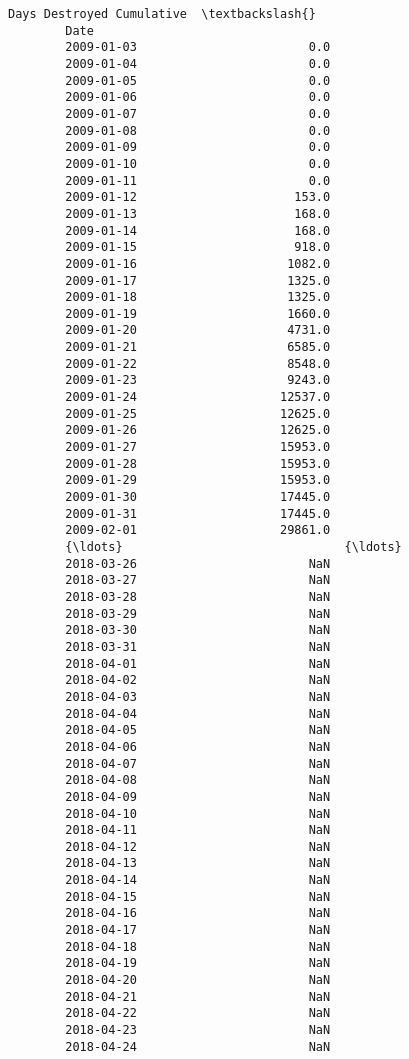 \documentclass[11pt]{article}
\begin{document}
\begin{Verbatim}[commandchars=\\\{\}]
                    Days Destroyed Cumulative  \textbackslash{}
        Date                                    
        2009-01-03                        0.0   
        2009-01-04                        0.0   
        2009-01-05                        0.0   
        2009-01-06                        0.0   
        2009-01-07                        0.0   
        2009-01-08                        0.0   
        2009-01-09                        0.0   
        2009-01-10                        0.0   
        2009-01-11                        0.0   
        2009-01-12                      153.0   
        2009-01-13                      168.0   
        2009-01-14                      168.0   
        2009-01-15                      918.0   
        2009-01-16                     1082.0   
        2009-01-17                     1325.0   
        2009-01-18                     1325.0   
        2009-01-19                     1660.0   
        2009-01-20                     4731.0   
        2009-01-21                     6585.0   
        2009-01-22                     8548.0   
        2009-01-23                     9243.0   
        2009-01-24                    12537.0   
        2009-01-25                    12625.0   
        2009-01-26                    12625.0   
        2009-01-27                    15953.0   
        2009-01-28                    15953.0   
        2009-01-29                    15953.0   
        2009-01-30                    17445.0   
        2009-01-31                    17445.0   
        2009-02-01                    29861.0   
        {\ldots}                               {\ldots}   
        2018-03-26                        NaN   
        2018-03-27                        NaN   
        2018-03-28                        NaN   
        2018-03-29                        NaN   
        2018-03-30                        NaN   
        2018-03-31                        NaN   
        2018-04-01                        NaN   
        2018-04-02                        NaN   
        2018-04-03                        NaN   
        2018-04-04                        NaN   
        2018-04-05                        NaN   
        2018-04-06                        NaN   
        2018-04-07                        NaN   
        2018-04-08                        NaN   
        2018-04-09                        NaN   
        2018-04-10                        NaN   
        2018-04-11                        NaN   
        2018-04-12                        NaN   
        2018-04-13                        NaN   
        2018-04-14                        NaN   
        2018-04-15                        NaN   
        2018-04-16                        NaN   
        2018-04-17                        NaN   
        2018-04-18                        NaN   
        2018-04-19                        NaN   
        2018-04-20                        NaN   
        2018-04-21                        NaN   
        2018-04-22                        NaN   
        2018-04-23                        NaN   
        2018-04-24                        NaN   
        

\end{Verbatim}
\end{document}
